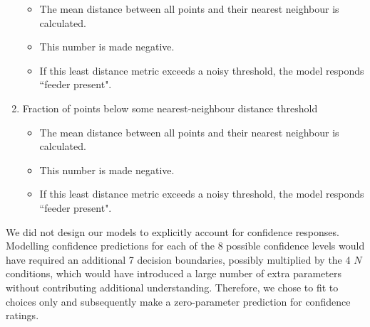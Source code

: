 \documentclass{article}
\begin{document}
\begin{enumerate}[label=H(\arabic*)]
\begin{itemize}
    \item The mean distance between all points and their nearest neighbour is calculated.
    \item This number is made negative.
    \item If this least distance metric exceeds a noisy threshold, the model responds ``feeder present".
\end{itemize} 
\item Fraction of points below some nearest-neighbour distance threshold
\begin{itemize}
    \item The mean distance between all points and their nearest neighbour is calculated.
    \item This number is made negative.
    \item If this least distance metric exceeds a noisy threshold, the model responds ``feeder present".
\end{itemize} 
\end{enumerate}

We did not design our models to explicitly account for confidence responses. Modelling confidence predictions for each of the 8 possible confidence levels would have required an additional 7 decision boundaries, possibly multiplied by the 4 $N$ conditions, which would have introduced a large number of extra parameters without contributing additional understanding. Therefore, we chose to fit to choices only and subsequently make a zero-parameter prediction for confidence ratings.


\end{document}
